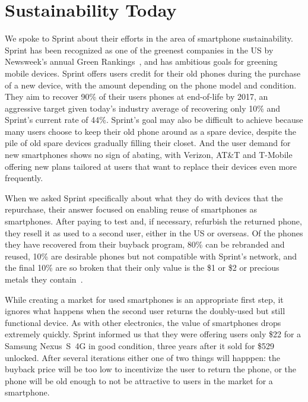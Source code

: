 \section{Sustainability Today}
\label{sec-sustainability}

We spoke to Sprint about their efforts in the area of smartphone
sustainability. Sprint has been recognized as one of the greenest companies
in the US by Newsweek's annual Green Rankings~\cite{sprintgreen-url}, and has
ambitious goals for greening mobile devices. Sprint offers users credit for
their old phones during the purchase of a new device, with the amount
depending on the phone model and condition. They aim to recover 90\% of their
users phones at end-of-life by 2017, an aggressive target given today's
industry average of recovering only 10\% and Sprint's current rate of 44\%.
Sprint's goal may also be difficult to achieve because many users choose to
keep their old phone around as a spare device, despite the pile of old spare
devices gradually filling their closet. And the user demand for new
smartphones shows no sign of abating, with Verizon, AT\&T and T-Mobile
offering new plans tailored at users that want to replace their devices even
more frequently.

When we asked Sprint specifically about what they do with devices that the
repurchase, their answer focused on enabling reuse of smartphones as
smartphones. After paying to test and, if necessary, refurbish the returned
phone, they resell it as used to a second user, either in the US or overseas.
Of the phones they have recovered from their buyback program, 80\% can be
rebranded and reused, 10\% are desirable phones but not compatible with
Sprint's network, and the final 10\% are so broken that their only value is
the \$1 or \$2 or precious metals they contain~\cite{FIXME-goldinphone}.

While creating a market for used smartphones is an appropriate first step, it
ignores what happens when the second user returns the doubly-used but still
functional device. As with other electronics, the value of smartphones drops
extremely quickly. Sprint informed us that they were offering users only \$22
for a Samsung Nexus~S~4G in good condition, three years after it sold for
\$529 unlocked. After several iterations either one of two things will
happpen: the buyback price will be too low to incentivize the user to return
the phone, or the phone will be old enough to not be attractive to users in
the market for a smartphone.

